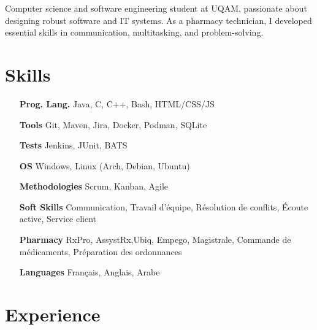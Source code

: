 \documentclass[letterpaper,10pt]{article}
\begin{document}


  Computer science and software engineering student at UQAM, passionate about designing robust software and IT systems. As a pharmacy technician, I developed essential skills in communication, multitasking, and problem-solving.

  \section{Skills}

  \begin{multicols}{2}
    \begin{itemize}[itemsep=-2px, parsep=5pt, leftmargin=75pt]
      \item[\textbf{Prog. Lang.}] Java, C, C++, Bash, HTML/CSS/JS
      \item[\textbf{Tools}] Git, Maven, Jira, Docker, Podman, SQLite
      \item[\textbf{Tests}] Jenkins, JUnit, BATS
      \item[\textbf{OS}]  Windows, Linux (Arch, Debian, Ubuntu)
      \item[\textbf{Methodologies}]  Scrum, Kanban, Agile
      \item[\textbf{Soft Skills}]  Communication, Travail d'équipe, Résolution de conflits, Écoute active, Service client
      \item[\textbf{Pharmacy}]  RxPro, AssystRx,Ubiq, Empego, Magistrale, Commande de médicaments, Préparation des ordonnances
      \item[\textbf{Languages}]  Français, Anglais, Arabe
    \end{itemize}
  \end{multicols}


  \section{Experience}
\end{document}
